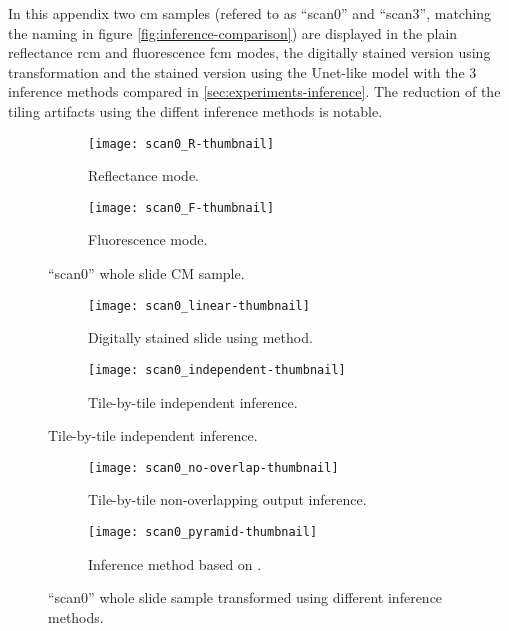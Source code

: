 \documentclass[../main.tex]{subfiles}
\begin{document}
In this appendix two \gls{cm} samples (refered to as ``scan0'' and ``scan3'',
matching the naming in figure \ref{fig:inference-comparison})
are displayed in the plain reflectance \gls{rcm}
and fluorescence \gls{fcm} modes, the digitally stained version using
\cite{Gareau2009} transformation and the stained version using the Unet-like
model with the 3 inference methods compared in \ref{sec:experiments-inference}. 
The reduction of the tiling artifacts using the diffent inference methods
is notable.

\newpage

\begin{figure}[H]
\centering
\begin{subfigure}{\textwidth}
\centering
\texttt{[image: scan0\_R-thumbnail]}
\caption{Reflectance mode.}
\label{fig:inference-comparison-scan0-R}
\end{subfigure}
\begin{subfigure}{\textwidth}
\centering
\texttt{[image: scan0\_F-thumbnail]}
\caption{Fluorescence mode.}
\label{fig:inference-comparison-scan0-F}
\end{subfigure}
\caption{``scan0'' whole slide CM sample.}
\end{figure}

\begin{figure}[H]
\centering
\begin{subfigure}{\textwidth}
\centering
\texttt{[image: scan0\_linear-thumbnail]}
\caption{Digitally stained slide using \cite{Gareau2009} method.}
\label{fig:inference-comparison-scan0-linear}
\end{subfigure}
\begin{subfigure}{\textwidth}
\centering
\texttt{[image: scan0\_independent-thumbnail]}
\caption{Tile-by-tile independent inference.}
\label{fig:inference-comparison-scan0-independent}
\end{subfigure}
\end{figure}%
\begin{figure}[H]\ContinuedFloat
\centering
\begin{subfigure}{\textwidth}
\centering
\texttt{[image: scan0\_no-overlap-thumbnail]}
\caption{Tile-by-tile non-overlapping output inference.}
\label{fig:inference-comparison-scan0-no-overlap}
\end{subfigure}
\begin{subfigure}{\textwidth}
\centering
\texttt{[image: scan0\_pyramid-thumbnail]}
\caption{Inference method based on \cite{Bel2019}.}
\label{fig:inference-comparison-scan0-pyramid}
\end{subfigure}
\caption{``scan0'' whole slide sample transformed using different inference
methods.}
\label{fig:inference-comparison-scan0}
\end{figure}
\end{document}
